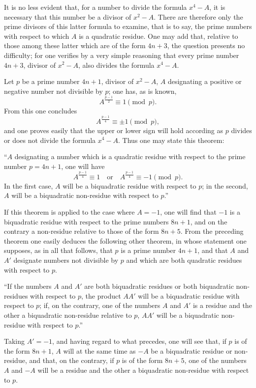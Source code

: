\documentclass[11pt]{article}
\newcommand{\unitid}[1]{\hypertarget{#1}{}}
\begin{document}
\unitid{dirichlet.v1.p04a.en.par.004}It is no less evident that, for a number to divide the formula $x^4-A$, it is necessary that this number be a divisor of $x^2-A$. There are therefore only the prime divisors of this latter formula to examine, that is to say, the prime numbers with respect to which $A$ is a quadratic residue. One may add that, relative to those among these latter which are of the form $4n+3$, the question presents no difficulty; for one verifies by a very simple reasoning that every prime number $4n+3$, divisor of $x^2-A$, also divides the formula $x^4-A$.

\unitid{dirichlet.v1.p04a.en.par.005}Let $p$ be a prime number $4n+1$, divisor of $x^2-A$, $A$ designating a positive or negative number not divisible by $p$; one has, as is known,
\[
 A^{\frac{p-1}{2}}\equiv 1 \pmod p.
\]
From this one concludes
\[
 A^{\frac{p-1}{4}}\equiv \pm 1 \pmod p,
\]
and one proves easily that the upper or lower sign will hold according as $p$ divides or does not divide the formula $x^4-A$. Thus one may state this theorem:

\unitid{dirichlet.v1.p04a.en.thm.001}“$A$ designating a number which is a quadratic residue with respect to the prime number $p=4n+1$, one will have
\[
 A^{\frac{p-1}{4}}\equiv 1\quad\text{or}\quad A^{\frac{p-1}{4}}\equiv -1 \pmod p.
\]
In the first case, $A$ will be a biquadratic residue with respect to $p$; in the second, $A$ will be a biquadratic non-residue with respect to $p$.”

\unitid{dirichlet.v1.p04a.en.par.006}If this theorem is applied to the case where $A=-1$, one will find that $-1$ is a biquadratic residue with respect to the prime numbers $8n+1$, and on the contrary a non-residue relative to those of the form $8n+5$. From the preceding theorem one easily deduces the following other theorem, in whose statement one supposes, as in all that follows, that $p$ is a prime number $4n+1$, and that $A$ and $A'$ designate numbers not divisible by $p$ and which are both quadratic residues with respect to $p$.

\unitid{dirichlet.v1.p04a.en.thm.002}“If the numbers $A$ and $A'$ are both biquadratic residues or both biquadratic non-residues with respect to $p$, the product $AA'$ will be a biquadratic residue with respect to $p$; if, on the contrary, one of the numbers $A$ and $A'$ is a residue and the other a biquadratic non-residue relative to $p$, $AA'$ will be a biquadratic non-residue with respect to $p$.”

\unitid{dirichlet.v1.p04a.en.par.007}Taking $A'=-1$, and having regard to what precedes, one will see that, if $p$ is of the form $8n+1$, $A$ will at the same time as $-A$ be a biquadratic residue or non-residue, and that, on the contrary, if $p$ is of the form $8n+5$, one of the numbers $A$ and $-A$ will be a residue and the other a biquadratic non-residue with respect to $p$.
\end{document}
